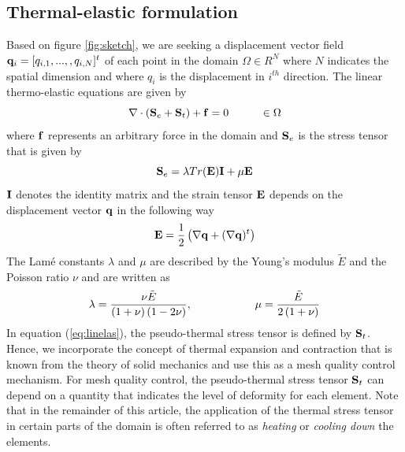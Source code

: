 \documentclass[review]{elsarticle}
\begin{document}
\subsection{Thermal-elastic formulation}
Based on figure \ref{fig:sketch}, we are seeking a displacement vector field ${\bf q}_i=[q_{i,1},...,,q_{i,N}]^t$
 of each point in the domain $\Omega \in {R}^N$ where $N$ indicates
  the spatial dimension and where $q_i$ is the displacement in $i^{th}$ direction. 
  The linear thermo-elastic equations are given by
\begin{equation}\label{eq:linelas}
\nabla\cdot\left({\bf S}_e + {\bf S}_t\right) + {\bf f} = 0\hspace{10 mm}\in \Omega
\end{equation}
where ${\bf f}$ represents an arbitrary force in the 
domain and ${\bf S}_e$ is the stress tensor that is given by
\begin{equation}
{\bf S}_e = \lambda Tr({\bf E}){\bf I}+\mu {\bf E}
\end{equation}
${\bf I}$ denotes the identity matrix and the strain tensor ${\bf E}$ 
depends on the displacement vector ${\bf q}$ in the following way
\begin{equation}
{\bf E} = \frac{1}{2}\left(\nabla {\bf q}+(\nabla {\bf q})^t\right)
\end{equation}
The Lam\'e constants $\lambda$ and $\mu$ are described by the Young's modulus $\tilde{E}$ and the Poisson ratio $\nu$ and are written as
\begin{equation}
\lambda = \frac{\nu \tilde{E}}{\left(1+\nu\right)\left(1-2\nu\right)},\hspace{20 mm}\mu = \frac{\tilde{E}}{2\left(1+\nu\right)}
\end{equation}
In equation (\ref{eq:linelas}), the pseudo-thermal stress tensor is defined by ${\bf S}_t$.
Hence, we incorporate the concept of thermal expansion and contraction that
 is known from the theory of solid mechanics and use this as a mesh quality control mechanism.
For mesh quality control, the pseudo-thermal stress tensor ${\bf S}_t$ can depend on a quantity that indicates
 the level of deformity for each element. 
 Note that in the remainder of this article, the application of the thermal
  stress tensor in certain parts of the domain is often referred to
   as {\it heating} or {\it cooling down} the elements.
\end{document}
